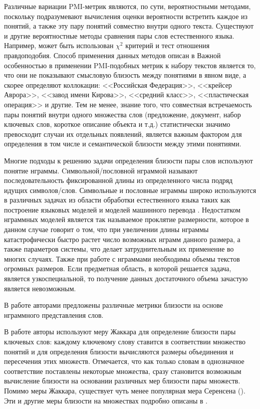 Различные вариации PMI-метрик являются, по сути, вероятностными методами, поскольку подразумевают вычисления оценки вероятности встретить каждое из понятий, а также эту пару понятий совместно внутри одного текста. Существуют и другие вероятностные методы сравнения пары слов естественного языка. Например, может быть использован $\chi^2$ критерий и тест отношения правдоподобия. Способ применения данных методов описан в \cite{freq_est_overview}
Важной особенностью в применении PMI-подобных метрик к набору текстов является то, что они не показывают смысловую близость между понятиями в явном виде, а скорее определяют коллокации: <<Российская Федерация>>, <<крейсер Аврора>>, <<завод имени Кирова>>, <<средний класс>>, <<пластическая операция>> и другие. Тем не менее, знание того, что совместная встречаемость пары понятий внутри одного множества слов (предложение, документ, набор ключевых слов, короткое описание объекта и т.д.) статистически значимо превосходит случаи их отдельных появлений, является важным фактором для определения в том числе и семантической близости между этими понятиями.

Многие подходы к решению задачи определения близости пары слов используют понятие нграммы.
Cимвольной/пословной нграммой называют последовательность фиксированной длины из определенного числа подряд идущих символов/слов. Символьные и пословные нграммы широко используются в различных задачах из области обработки естественного языка таких как построение языковых моделей \cite{ngrams_1,ngrams_2,ngrams_3,ngrams_4} и моделей машинного перевода \cite{ngrams_mt_1,ngrams_mt_2,ngrams_mt_3}. Недостатком нграммных моделей является так называемое проклятие размерности, которое в данном случае говорит о том, что при увеличении длины нграммы катастрофически быстро растет число возможных нграмм данного размера, а также параметров системы, что делает затруднительным их применение во многих случаях. Также при работе с нграммами необходимы объемы текстов огромных размеров. Если предметная область, в которой решается задача, является узкоспециальной, то получение данных достаточного объема зачастую является невозможным.

В работе \cite{ngrams_sim} авторами предложены различные метрики близости на основе нграммного представления слов.

В работе \cite{Albatineh2011} авторы используют  меру Жаккара для определение близости пары ключевых слов: каждому ключевому слову ставится в соответствии множество понятий и для определения близости вычисляются размеры объединения и пересечения этих множеств. Отмечается, что как только словам в однозначное соответствие поставлены некоторые множества, сразу становится возможным вычисление близости на основании различных мер близости пары множеств. Помимо меры Жаккара, существует чуть менее популярная мера Серенсена (\cite{dice_1}). Эти и другие меры близости на множествах подробно описаны в \cite{dist_between_sets}.

